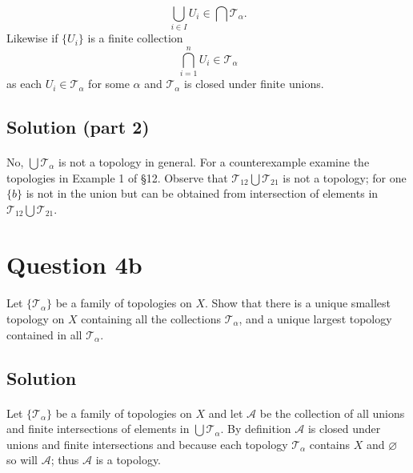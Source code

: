 \documentclass[11pt, oneside]{article}   	%
\begin{document}
\[
\bigcup_{i \in I} U_i \in \bigcap \mathscr{T}_\alpha .
\]
Likewise if $\{U_i\}$ is a finite collection
\[
\bigcap_{i=1}^n U_i \in \mathscr{T}_\alpha
\]
as each $U_i \in \mathscr{T}_\alpha$ for some $\alpha$ and $\mathscr{T}_\alpha$ is closed under finite unions.

\subsection*{Solution (part 2)}
\paragraph{}
No, $\bigcup \mathscr{T}_\alpha$ is not a topology in general. For a counterexample examine the topologies in Example 1 of \S12. Observe that $\mathscr{T}_{12} \bigcup \mathscr{T}_{21}$ is not a topology; for one $\{b\}$ is not in the union but can be obtained from intersection of elements in $\mathscr{T}_{12} \bigcup \mathscr{T}_{21}$.


\section*{Question 4b}
\paragraph{}

Let $\{ \mathscr{T}_\alpha\}$ be a family of topologies on $X$. Show that there is a unique smallest topology on $X$ containing all the collections $\mathscr{T}_\alpha$, and a unique largest topology contained in all $\mathscr{T}_\alpha$.

\subsection*{Solution}
\paragraph{}

Let $\{ \mathscr{T}_\alpha\}$ be a family of topologies on $X$ and let $\mathscr{A}$ be the collection of all unions and finite intersections of elements in $\bigcup \mathscr{T}_\alpha$. By definition $\mathscr{A}$ is closed under unions and finite intersections and because each topology $\mathscr{T}_\alpha$ contains $X$ and $\varnothing$ so will $\mathscr{A}$; thus $\mathscr{A}$ is a topology.
\end{document}
